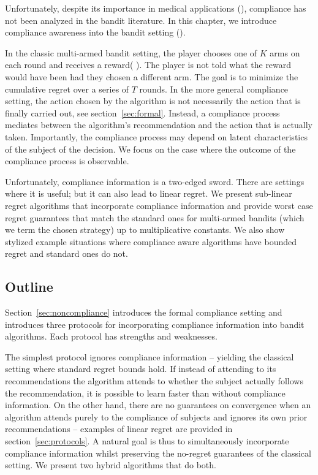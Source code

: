 Unfortunately, despite its importance in medical applications (\cite{vrijens:12,hugtenburg:13}), compliance has not been analyzed in the bandit literature.
In this chapter, we introduce compliance awareness into the bandit setting (\cite{bubeck:12}).

In the classic multi-armed bandit setting, the player chooses one of $K$ arms on each round and receives a reward( \cite{auer:02b,auer:02}). The player is not told what the reward would have been had they chosen a different arm. The goal is to minimize the cumulative regret over a series of $T$ rounds. In the more general compliance setting, the action chosen by the algorithm is not necessarily the action that is finally carried out, see section~\ref{sec:formal}. Instead, a compliance process mediates between the algorithm's recommendation and the action that is actually taken. Importantly, the compliance process may depend on latent characteristics of the subject of the decision. We focus on the case where the outcome of the compliance process is observable.

Unfortunately, compliance information is a two-edged sword. There are settings where it is useful; but  it can also lead to linear regret. We present sub-linear regret algorithms that incorporate compliance information and provide worst case regret guarantees that match the standard ones for multi-armed bandits (which we term the chosen strategy) up to multiplicative constants. We also show stylized example situations where compliance aware algorithms have bounded regret and standard ones do not.


\subsection{Outline}
Section~\ref{sec:noncompliance} introduces the formal compliance setting and introduces three protocols for incorporating compliance information into bandit algorithms. Each protocol has strengths and weaknesses.

The simplest protocol ignores compliance information -- yielding the classical setting where standard regret bounds hold. If instead of attending to its recommendations the algorithm attends to whether the subject actually follows the recommendation, it is possible to learn faster than without compliance information. On the other hand, there are no guarantees on convergence when an algorithm attends purely to the compliance of subjects and ignores its own prior recommendations -- examples of linear regret are provided in section~\ref{sec:protocols}. A natural goal is thus to simultaneously incorporate compliance information whilst preserving the no-regret guarantees of the classical setting. We present two hybrid algorithms that do both.

